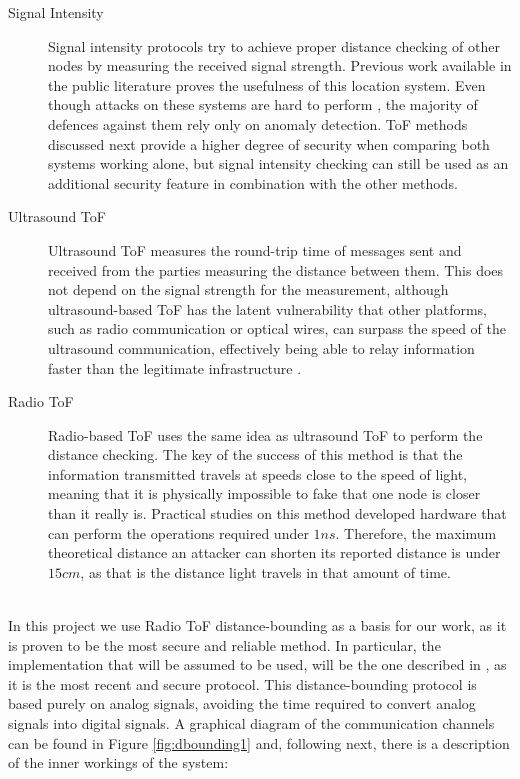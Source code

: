 \documentclass{article}
\begin{document}
\begin{description}
  \item[Signal Intensity] Signal intensity protocols try to achieve proper distance checking of other nodes by measuring the received signal strength. Previous work available in the public literature \cite{seshadri2005bayesian} proves the usefulness of this location system. Even though attacks on these systems are hard to perform \cite{sheng2008detecting}, the majority of defences against them rely only on anomaly detection. ToF methods discussed next provide a higher degree of security when comparing both systems working alone, but signal intensity checking can still be used as an additional security feature in combination with the other methods.\\
  
  \item[Ultrasound ToF] Ultrasound ToF measures the round-trip time of messages sent and received from the parties measuring the distance between them. This does not depend on the signal strength for the measurement, although ultrasound-based ToF has the latent vulnerability that other platforms, such as radio communication or optical wires, can surpass the speed of the ultrasound communication, effectively being able to relay information faster than the legitimate infrastructure \cite{capkun2006secure}.\\
  
  \item[Radio ToF] Radio-based ToF uses the same idea as ultrasound ToF to perform the distance checking. The key of the success of this method is that the information transmitted travels at speeds close to the speed of light, meaning that it is physically impossible to fake that one node is closer than it really is. Practical studies on this method \cite{rasmussen2010realization} developed hardware that can perform the operations required under $1ns$. Therefore, the maximum theoretical distance an attacker can shorten its reported distance is under $15cm$, as that is the distance light travels in that amount of time.\\\
\end{description}

In this project we use Radio ToF distance-bounding as a basis for our work, as it is proven to be the most secure and reliable method. In particular, the implementation that will be assumed to be used, will be the one described in \cite{rasmussen2010realization}, as it is the most recent and secure protocol. This distance-bounding protocol is based purely on analog signals, avoiding the time required to convert analog signals into digital signals. A graphical diagram of the communication channels can be found in Figure \ref{fig:dbounding1} and, following next, there is a description of the inner workings of the system:\\
\end{document}
